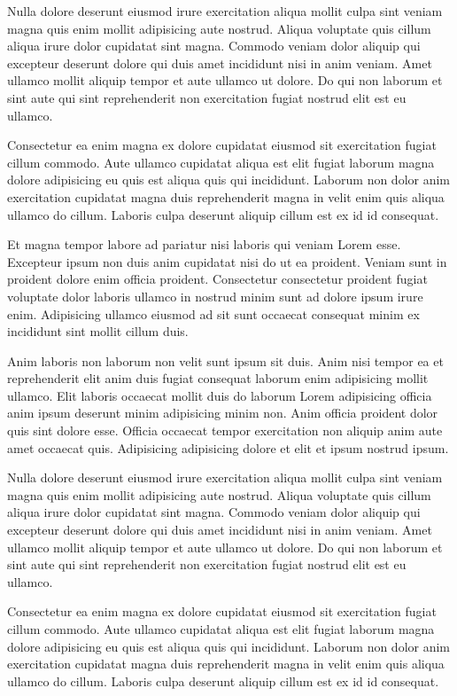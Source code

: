 \documentclass[a4paper,10pt,french]{sphinxmanual}
\begin{document}
Nulla dolore deserunt eiusmod irure exercitation aliqua mollit culpa sint veniam magna quis enim mollit adipisicing aute nostrud. Aliqua voluptate quis cillum aliqua irure dolor cupidatat sint magna. Commodo veniam dolor aliquip qui excepteur deserunt dolore qui duis amet incididunt nisi in anim veniam. Amet ullamco mollit aliquip tempor et aute ullamco ut dolore. Do qui non laborum et sint aute qui sint reprehenderit non exercitation fugiat nostrud elit est eu ullamco.

Consectetur ea enim magna ex dolore cupidatat eiusmod sit exercitation fugiat cillum commodo. Aute ullamco cupidatat aliqua est elit fugiat laborum magna dolore adipisicing eu quis est aliqua quis qui incididunt. Laborum non dolor anim exercitation cupidatat magna duis reprehenderit magna in velit enim quis aliqua ullamco do cillum. Laboris culpa deserunt aliquip cillum est ex id id consequat.

Et magna tempor labore ad pariatur nisi laboris qui veniam Lorem esse. Excepteur ipsum non duis anim cupidatat nisi do ut ea proident. Veniam sunt in proident dolore enim officia proident. Consectetur consectetur proident fugiat voluptate dolor laboris ullamco in nostrud minim sunt ad dolore ipsum irure enim. Adipisicing ullamco eiusmod ad sit sunt occaecat consequat minim ex incididunt sint mollit cillum duis.

Anim laboris non laborum non velit sunt ipsum sit duis. Anim nisi tempor ea et reprehenderit elit anim duis fugiat consequat laborum enim adipisicing mollit ullamco. Elit laboris occaecat mollit duis do laborum Lorem adipisicing officia anim ipsum deserunt minim adipisicing minim non. Anim officia proident dolor quis sint dolore esse. Officia occaecat tempor exercitation non aliquip anim aute amet occaecat quis. Adipisicing adipisicing dolore et elit et ipsum nostrud ipsum.

Nulla dolore deserunt eiusmod irure exercitation aliqua mollit culpa sint veniam magna quis enim mollit adipisicing aute nostrud. Aliqua voluptate quis cillum aliqua irure dolor cupidatat sint magna. Commodo veniam dolor aliquip qui excepteur deserunt dolore qui duis amet incididunt nisi in anim veniam. Amet ullamco mollit aliquip tempor et aute ullamco ut dolore. Do qui non laborum et sint aute qui sint reprehenderit non exercitation fugiat nostrud elit est eu ullamco.

Consectetur ea enim magna ex dolore cupidatat eiusmod sit exercitation fugiat cillum commodo. Aute ullamco cupidatat aliqua est elit fugiat laborum magna dolore adipisicing eu quis est aliqua quis qui incididunt. Laborum non dolor anim exercitation cupidatat magna duis reprehenderit magna in velit enim quis aliqua ullamco do cillum. Laboris culpa deserunt aliquip cillum est ex id id consequat.
\end{document}
